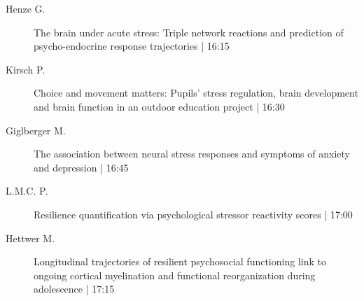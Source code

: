 \begin{symposium}
\begin{description}
                \item [ Henze G.] The brain under acute stress: Triple network reactions and prediction of psycho-endocrine response trajectories \textcolor{mygray}{ | 16:15}    
                
                \item [ Kirsch P.] Choice and movement matters: Pupils' stress regulation, brain development and brain function in an outdoor education project  \textcolor{mygray}{ | 16:30}    
                
                \item [ Giglberger M.] The association between neural stress responses and symptoms of anxiety and depression \textcolor{mygray}{ | 16:45}    
                
                \item [ L.M.C. P.] Resilience quantification via psychological stressor reactivity scores \textcolor{mygray}{ | 17:00}    
                
                \item [ Hettwer M.] Longitudinal trajectories of resilient psychosocial functioning link to ongoing cortical myelination and functional reorganization during adolescence \textcolor{mygray}{ | 17:15}    
                
            \end{description} 
            \end{symposium}
            